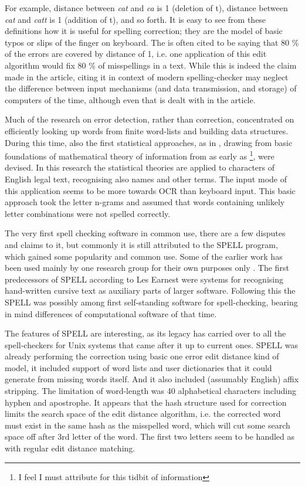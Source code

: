 \documentclass[officiallayout,draft]{unihelcompling}
\begin{document}
For example, distance between \emph{cat} and \emph{ca} is 1 (deletion of t),
distance between \emph{cat} and \emph{catt} is 1 (addition of t), and so forth.
It is easy to see from these definitions how it is useful for spelling
correction; they are the model of basic typos or slips of the finger on
keyboard. The \cite{damerau1964technique} is often cited to be saying that
80 \% of the errors are covered by distance of 1, i.e. one application of this
edit algorithm would fix 80 \% of misspellings in a text. While this is indeed
the claim made in the article, citing it in context of modern spelling-checker
may neglect the difference between input mechanisms (and data transmission,
and storage) of computers of the time, although even that is dealt with in
the article.

Much of the research on error detection, rather than correction, concentrated
on efficiently looking up words from finite word-lists and building data
structures\cite{}. During this time, also the first statistical approaches, as
in \cite{raviv1967decision}, drawing from basic foundations of mathematical
theory of information from as early as
\cite{shannon1948mathematical}\footnote{I feel I must attribute
\cite{liberman2012noisily} for this tidbit of information}, were devised. In
this research the statistical theories are applied to characters of English
legal text, recognising also names and other terms. The input mode of this
application seems to be more towards OCR than keyboard input. This basic approach took the letter n-grams and assumed that words
containing unlikely letter combinations were not spelled correctly.

The very first spell checking software in common use, there are a few disputes
and claims to it, but commonly it is still attributed to the SPELL
program\cite{gorin1971spell}, which gained some popularity and common use. Some
of the earlier work has been used mainly by one research group for their own
purposes only \cite{earnest2011first,earnest2012first}. The first predecessors
of SPELL according to Les Earnest were systems for recognising hand-written
cursive text as auxiliary parts of larger software. Following this the SPELL
was possibly among first self-standing software for spell-checking, bearing in
mind differences of computational software of that time.

The features of SPELL are interesting, as its legacy has carried over to all
the spell-checkers for Unix systems that came after it up to current ones.
SPELL was already performing the correction using basic one error edit distance
kind of model, it included support of word lists and user dictionaries that it
could generate from missing words itself. And it also included (assumably
English) affix stripping. The limitation of
word-length was 40 alphabetical characters including hyphen and apostrophe. It
appears that the hash structure used for correction limits the search space of
the edit distance algorithm, i.e. the corrected word must exist in the same
hash as the misspelled word, which will cut some search space off after 3rd
letter of the word. The first two letters seem to be handled as with regular
edit distance matching. \cite{gorin1971spell}
\end{document}

